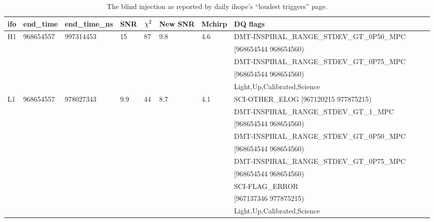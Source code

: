 \begin{landscape}
\begin{table}
\begin{center}
\begin{tabular}{lllllllllll}
\hline
ifo & end\_time & end\_time\_ns & SNR & $\chi^2$ & New SNR & Mchirp & DQ flags \\
\hline
H1  & 968654557 & 997314453 & 15 & 87 & 9.8 & 4.6 & DMT-INSPIRAL\_RANGE\_STDEV\_GT\_0P50\_MPC \\
    &           &           &    &     &    &     & \hspace*{0.5 in} [968654544 968654560) \\
    &           &           &    &     &    &     & DMT-INSPIRAL\_RANGE\_STDEV\_GT\_0P75\_MPC \\
    &           &           &    &     &    &     & \hspace*{0.5 in} [968654544 968654560) \\
    &           &           &    &     &    &     & Light,Up,Calibrated,Science \\
\hline
L1 & 968654557 & 978027343 & 9.9 & 44 & 8.7 & 4.1 & SCI-OTHER\_ELOG [967120215 977875215) \\
    &           &           &    &     &    &     & DMT-INSPIRAL\_RANGE\_STDEV\_GT\_1\_MPC \\
    &           &           &    &     &    &     & \hspace*{0.5 in} [968654544 968654560) \\
    &           &           &    &     &    &     & DMT-INSPIRAL\_RANGE\_STDEV\_GT\_0P50\_MPC \\
    &           &           &    &     &    &     & \hspace*{0.5 in} [968654544 968654560) \\
    &           &           &    &     &    &     & DMT-INSPIRAL\_RANGE\_STDEV\_GT\_0P75\_MPC \\
    &           &           &    &     &    &     & \hspace*{0.5 in} [968654544 968654560) \\
    &           &           &    &     &    &     & SCI-FLAG\_ERROR \\
    &           &           &    &     &    &     & \hspace*{0.5 in} [967137346 977875215) \\
    &           &           &    &     &    &     & Light,Up,Calibrated,Science \\
\hline
\end{tabular}
\end{center}
  \caption[Recovered blind injection parameters]{
  \label{tab:daily_ihope_dog}
The blind injection as reported by daily ihope's ``loudest triggers'' page.}
\end{table}
\end{landscape}



